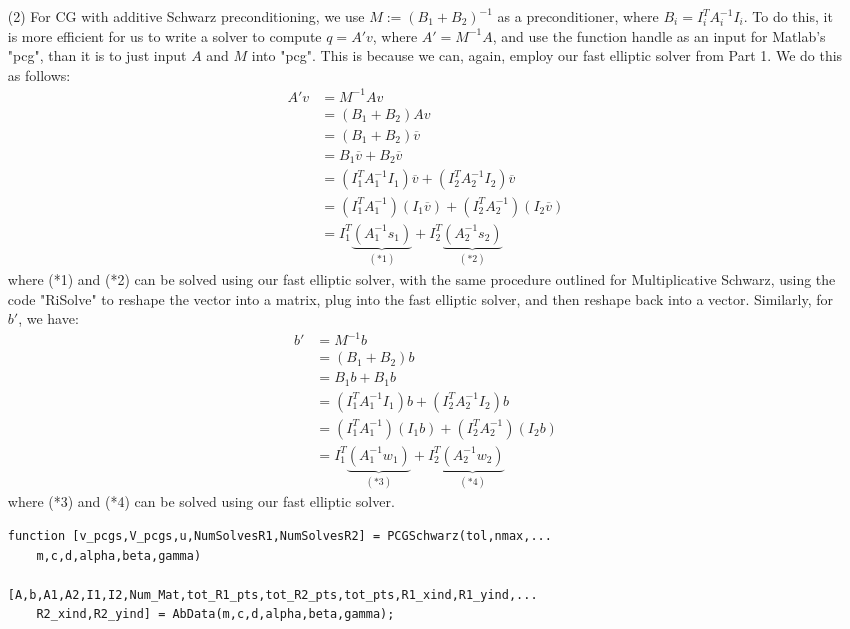 \documentclass[12pt]{article}
\begin{document}
\begin{itemize}
\item[(2)] For CG with additive Schwarz preconditioning, we use $M:=(B_1 + B_2)^{-1}$ as a preconditioner, where $B_i = I_i^TA_i^{-1}I_i$.  To do this, it is more efficient for us to write a solver to compute $q = A'v$, where $A' = M^{-1}A$, and use the function handle as an input for Matlab's "pcg", than it is to just input $A$ and $M$ into "pcg".  This is because we can, again, employ our fast elliptic solver from Part 1.  We do this as follows:
\begin{align*}
A'v &= M^{-1}Av \\
&= (B_1 + B_2)Av \\
& = (B_1 + B_2)\overline{v} \\
&= B_1\overline{v} + B_2\overline{v} \\
&= \left(I_1^TA_1^{-1}I_1\right)\overline{v} + \left(I_2^TA_2^{-1}I_2\right)\overline{v} \\
&= \left(I_1^TA_1^{-1}\right)\left(I_1\overline{v}\right) + \left(I_2^TA_2^{-1}\right)\left(I_2\overline{v}\right) \\
&= I_1^T\underbrace{\left(A_1^{-1}s_1\right)}_{(*1)} + I_2^T\underbrace{\left(A_2^{-1}s_2\right)}_{(*2)} 
\end{align*}
where (*1) and (*2) can be solved using our fast elliptic solver, with the same procedure outlined for Multiplicative Schwarz, using the code "RiSolve" to reshape the vector into a matrix, plug into the fast elliptic solver, and then reshape back into a vector.  Similarly, for $b'$, we have:
\begin{align*}
b' &= M^{-1}b \\
&= (B_1 + B_2)b \\
&= B_1b + B_1b \\
&= \left(I_1^TA_1^{-1}I_1\right)b + \left(I_2^TA_2^{-1}I_2\right)b \\
&= \left(I_1^TA_1^{-1}\right)\left(I_1b\right) + \left(I_2^TA_2^{-1}\right)\left(I_2b\right) \\
&= I_1^T\underbrace{\left(A_1^{-1}w_1\right)}_{(*3)} + I_2^T\underbrace{\left(A_2^{-1}w_2\right)}_{(*4)}
\end{align*} 
where (*3) and (*4) can be solved using our fast elliptic solver.

\lstset{language=matlab,frame=single}
\begin{lstlisting}[caption=CG Method with Additive Schwarz Preconditioner]
function [v_pcgs,V_pcgs,u,NumSolvesR1,NumSolvesR2] = PCGSchwarz(tol,nmax,...
    m,c,d,alpha,beta,gamma)

[A,b,A1,A2,I1,I2,Num_Mat,tot_R1_pts,tot_R2_pts,tot_pts,R1_xind,R1_yind,...
    R2_xind,R2_yind] = AbData(m,c,d,alpha,beta,gamma);


\end{lstlisting}
\end{itemize}
\end{document}
